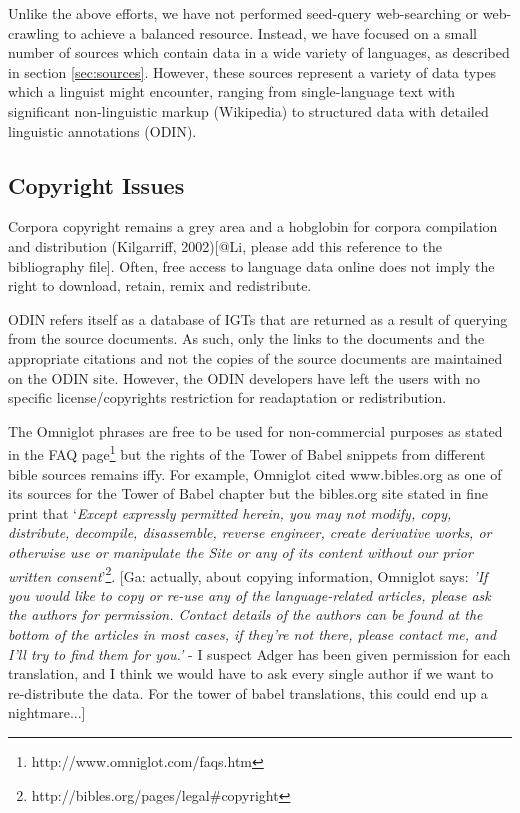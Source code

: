 Unlike the above efforts, we have not performed seed-query web-searching or web-crawling to achieve a balanced resource. Instead, we have focused on a small number of sources which contain data in a wide variety of languages, as described in section \ref{sec:sources}. However, these sources represent a variety of data types which a linguist might encounter, ranging from single-language text with significant non-linguistic markup (Wikipedia) to structured data with detailed linguistic annotations (ODIN).


\subsection{Copyright Issues} \label{sec:copyright}

Corpora copyright remains a grey area and a hobglobin for corpora compilation and distribution (Kilgarriff, 2002)[@Li, please add this reference to the bibliography file]. Often, free access to language data online does not imply the right to download, retain, remix and redistribute. 

ODIN refers itself as a database of IGTs that are returned as a result of querying from the source documents. As such, only the links to the documents and the appropriate citations and not the copies of the source documents are maintained on the ODIN site. However, the ODIN developers have left the users with no specific license/copyrights restriction for readaptation or redistribution.

The Omniglot phrases are free to be used for non-commercial purposes as stated in the FAQ page\footnote{http://www.omniglot.com/faqs.htm} but the rights of the Tower of Babel snippets from different bible sources remains iffy. For example, Omniglot cited www.bibles.org as one of its sources for the Tower of Babel chapter but the bibles.org site stated in fine print that `\emph{Except expressly permitted herein, you may not modify, copy, distribute, decompile, disassemble, reverse engineer, create derivative works, or otherwise use or manipulate the Site or any of its content without our prior written consent}'\footnote{http://bibles.org/pages/legal\#copyright}. [Ga: actually, about copying information, Omniglot says: \emph{'If you would like to copy or re-use any of the language-related articles, please ask the authors for permission. Contact details of the authors can be found at the bottom of the articles in most cases, if they're not there, please contact me, and I'll try to find them for you.'} - I suspect Adger has been given permission for each translation, and I think we would have to ask every single author if we want to re-distribute the data.  For the tower of babel translations, this could end up a nightmare...]

